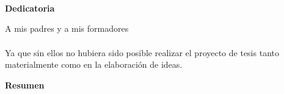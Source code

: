 \newpage
\thispagestyle{empty} \textbf{}\normalsize
\\\\\\%
\textbf{Dedicatoria}\\[4.0cm]

\begin{flushright}
\begin{minipage}{8cm}
    \noindent
        \small
        A mis padres y a mis formadores\\[1.0cm]\\
		Ya que sin ellos no hubiera sido posible realizar el proyecto de tesis tanto materialmente como en la elaboraci\'{o}n de ideas.\\
\end{minipage}
\end{flushright}




\newpage
\textbf{\LARGE Resumen}
\\\\

